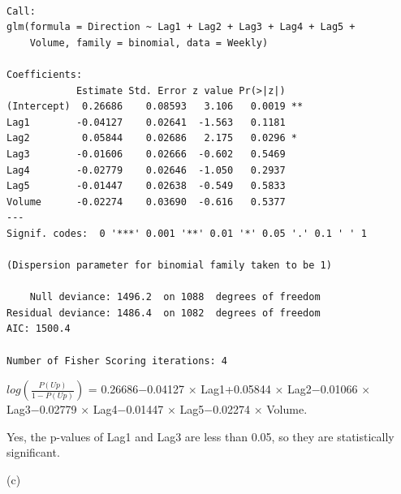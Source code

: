 \documentclass[
]{article}
\newenvironment{Shaded}{\begin{snugshade}}{\end{snugshade}}
\newcommand{\AttributeTok}[1]{\textcolor[rgb]{0.40,0.45,0.13}{#1}}
\newcommand{\CommentTok}[1]{\textcolor[rgb]{0.37,0.37,0.37}{#1}}
\newcommand{\FloatTok}[1]{\textcolor[rgb]{0.68,0.00,0.00}{#1}}
\newcommand{\FunctionTok}[1]{\textcolor[rgb]{0.28,0.35,0.67}{#1}}
\newcommand{\NormalTok}[1]{\textcolor[rgb]{0.00,0.23,0.31}{#1}}
\newcommand{\OtherTok}[1]{\textcolor[rgb]{0.00,0.23,0.31}{#1}}
\newcommand{\SpecialCharTok}[1]{\textcolor[rgb]{0.37,0.37,0.37}{#1}}
\newcommand{\StringTok}[1]{\textcolor[rgb]{0.13,0.47,0.30}{#1}}
\begin{document}
\begin{verbatim}

Call:
glm(formula = Direction ~ Lag1 + Lag2 + Lag3 + Lag4 + Lag5 + 
    Volume, family = binomial, data = Weekly)

Coefficients:
            Estimate Std. Error z value Pr(>|z|)   
(Intercept)  0.26686    0.08593   3.106   0.0019 **
Lag1        -0.04127    0.02641  -1.563   0.1181   
Lag2         0.05844    0.02686   2.175   0.0296 * 
Lag3        -0.01606    0.02666  -0.602   0.5469   
Lag4        -0.02779    0.02646  -1.050   0.2937   
Lag5        -0.01447    0.02638  -0.549   0.5833   
Volume      -0.02274    0.03690  -0.616   0.5377   
---
Signif. codes:  0 '***' 0.001 '**' 0.01 '*' 0.05 '.' 0.1 ' ' 1

(Dispersion parameter for binomial family taken to be 1)

    Null deviance: 1496.2  on 1088  degrees of freedom
Residual deviance: 1486.4  on 1082  degrees of freedom
AIC: 1500.4

Number of Fisher Scoring iterations: 4
\end{verbatim}

\(log(\frac{P(Up)}{1-P(Up)})\) = 0.26686−0.04127 × Lag1+0.05844 ×
Lag2−0.01066 × Lag3−0.02779 × Lag4−0.01447 × Lag5−0.02274 × Volume.

Yes, the p-values of Lag1 and Lag3 are less than 0.05, so they are
statistically significant.

(c)

\begin{Shaded}
\end{Shaded}
\end{document}
